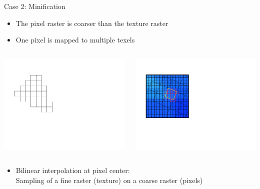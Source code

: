 \documentclass[utf8,stillsansserifmath,fleqn,t]{beamer}
\begin{document}
\begin{frame}[label=texture-mapping-minification]
\frametitle{\insertsection}
Case 2: Minification
\begin{itemize}
\item The pixel raster is coarser than the texture raster
\item One pixel is mapped to multiple texels
\end{itemize}
\begin{columns}
\centerline{\includegraphics[width=.6\textwidth]{./fig/texture-mag-0.pdf}}
\centerline{\includegraphics[width=.8\textwidth]{./fig/texture-min-1.pdf}}
\end{columns}
\begin{itemize}
\item Bilinear interpolation at pixel center:\\
    Sampling of a fine raster (texture) on a coarse raster (pixels)
\end{itemize}
\end{frame}
\end{document}

